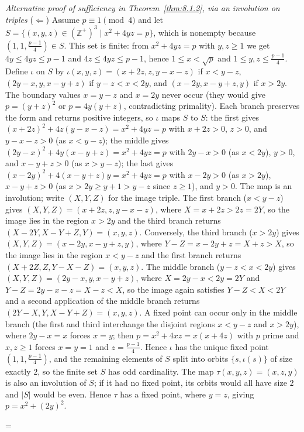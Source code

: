 \documentclass[11pt]{article}
\makeatletter
\let\nt@closedisplay\]
\def\nt@guardedclose{\@ifnextchar\par{\nt@closeafterpar}{\@ifnextchar\end{\postdisplaypenalty\@M\nt@closedisplay}{\nt@closedisplay}}}
\def\nt@closeafterpar\par{\@ifnextchar\par{\nt@closeafterpar}{\@ifnextchar\end{\postdisplaypenalty\@M\nt@closedisplay\par}{\nt@closedisplay\par}}}
\renewenvironment{proof}[1][\proofname]{\par
  \pushQED{\qed}\normalfont\topsep\medskipamount\edef\nt@afterproof{\@endparpenalty=\the\@endparpenalty\relax}\@beginparpenalty\@M\@endparpenalty\@M\let\]\nt@guardedclose\trivlist\item[]\textit{#1\@addpunct{.}} \ignorespaces}{\ifvmode\addpenalty\@M\fi\popQED\nt@afterproof\endtrivlist\@endpefalse}
\theoremstyle{ntstyle}
\newenvironment{altproof}[1][\proofname]
  {\begin{proof}[#1]\renewcommand{\qedsymbol}{}}{\end{proof}}
\makeatother
\begin{document}
\begin{altproof}[Alternative proof of sufficiency in Theorem~\ref{thm:8.1.2}, via an involution on triples] ($\Leftarrow$) Assume $p \equiv 1 \pmod{4}$ and let $S = \{(x, y, z) \in (\mathbb{Z}^+)^3 \mid x^2 + 4yz = p\}$, which is nonempty because $(1, 1, \tfrac{p-1}{4}) \in S$. This set is finite:
  from $x^2+4yz=p$ with $y,z\ge1$ we get $4y\le 4yz\le p-1$ and
  $4z\le 4yz\le p-1$, hence $1\le x<\sqrt{p}$ and $1\le y,z\le\tfrac{p-1}{4}$. Define
  $\iota$ on $S$
  by $\iota(x, y, z) = (x + 2z, z, y - x - z)$ if $x < y - z$, $(2y - x, y, x - y + z)$ if $y - z < x < 2y$, and
  $(x - 2y, x - y + z, y)$ if $x > 2y$. The boundary values $x = y - z$ and $x = 2y$ never occur (they
  would give $p = (y+z)^2$ or $p = 4y(y+z)$, contradicting primality).
  Each branch preserves the form and returns positive integers, so
  $\iota$ maps $S$ to $S$: the first gives
  $(x+2z)^2+4z(y-x-z)=x^2+4yz=p$ with $x+2z>0$, $z>0$, and $y-x-z>0$
  (as $x<y-z$); the middle gives $(2y-x)^2+4y(x-y+z)=x^2+4yz=p$ with
  $2y-x>0$ (as $x<2y$), $y>0$, and $x-y+z>0$ (as $x>y-z$); the last
  gives $(x-2y)^2+4(x-y+z)y=x^2+4yz=p$ with $x-2y>0$ (as $x>2y$),
  $x-y+z>0$ (as $x>2y\ge y+1>y-z$ since $z\ge1$), and $y>0$. The map is an involution; write $(X,Y,Z)$ for the
  image triple. The first branch ($x<y-z$) gives $(X,Y,Z)=(x+2z,z,y-x-z)$, where $X=x+2z>2z=2Y$, so the image lies
  in the region $x>2y$ and the third branch returns $(X-2Y,X-Y+Z,Y)=(x,y,z)$. Conversely, the third branch ($x>2y$)
  gives $(X,Y,Z)=(x-2y,x-y+z,y)$, where $Y-Z=x-2y+z=X+z>X$, so the image lies in the region $x<y-z$ and the first
  branch returns $(X+2Z,Z,Y-X-Z)=(x,y,z)$. The middle branch ($y-z<x<2y$) gives $(X,Y,Z)=(2y-x,y,x-y+z)$, where
  $X=2y-x<2y=2Y$ and $Y-Z=2y-x-z=X-z<X$, so the image again satisfies $Y-Z<X<2Y$ and a second application of the
  middle branch returns $(2Y-X,Y,X-Y+Z)=(x,y,z)$. A fixed point can occur only in the middle branch (the first and
  third interchange the disjoint regions $x<y-z$ and $x>2y$), where $2y-x=x$ forces $x=y$; then $p=x^2+4xz=x(x+4z)$
  with $p$ prime and $x,z\ge1$ forces $x=y=1$ and $z=\tfrac{p-1}{4}$. Hence $\iota$ has the unique fixed point
  $(1,1,\tfrac{p-1}{4})$, and the remaining elements of $S$ split into orbits $\{s,\iota(s)\}$ of size exactly $2$,
  so the finite set $S$ has odd cardinality. The map $\tau(x, y, z) = (x, z, y)$ is also an involution of $S$; if
  it had no fixed point, its orbits would all have size $2$ and $|S|$ would be even. Hence $\tau$ has a
  fixed point, where $y = z$, giving $p = x^2 + (2y)^2$.

\end{altproof}
\end{document}

